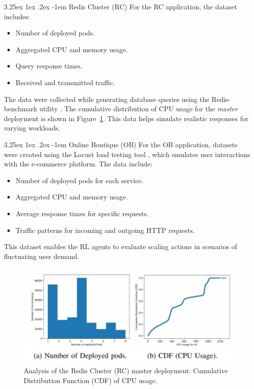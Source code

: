 \documentclass[conference]{IEEEtran}
\makeatletter
\renewcommand\paragraph{\@startsection{paragraph}{5}{\z@}%
  {3.25ex \@plus1ex \@minus.2ex}%
  {-1em}%
  {\normalfont\normalsize\bfseries}}
\makeatother
\begin{document}
\paragraph{Redis Cluster (RC)}
For the RC application, the dataset includes:
\begin{itemize}
    \item Number of deployed pods.
    \item Aggregated CPU and memory usage.
    \item Query response times.
    \item Received and transmitted traffic.
\end{itemize}
The data were collected while generating database queries using the Redis-benchmark utility \cite{redisBenchmark}. The cumulative distribution of CPU usage for the \textit{master} deployment is shown in Figure~\ref{fig:redis-cdf}. This data helps simulate realistic responses for varying workloads.

\paragraph{Online Boutique (OB)}
For the OB application, datasets were created using the Locust load testing tool \cite{locust}, which emulates user interactions with the e-commerce platform. The data include:
\begin{itemize}
    \item Number of deployed pods for each service.
    \item Aggregated CPU and memory usage.
    \item Average response times for specific requests.
    \item Traffic patterns for incoming and outgoing HTTP requests.
\end{itemize}
This dataset enables the RL agents to evaluate scaling actions in scenarios of fluctuating user demand.

\begin{figure}[h]
    \centering
    \includegraphics[width=0.8\linewidth]{images/2024_11_17_21ad14b6196e5740bf69g-7(2)}
    \caption{Analysis of the Redis Cluster (RC) master deployment: Cumulative Distribution Function (CDF) of CPU usage.}
    \label{fig:redis-cdf}
\end{figure}
\end{document}
